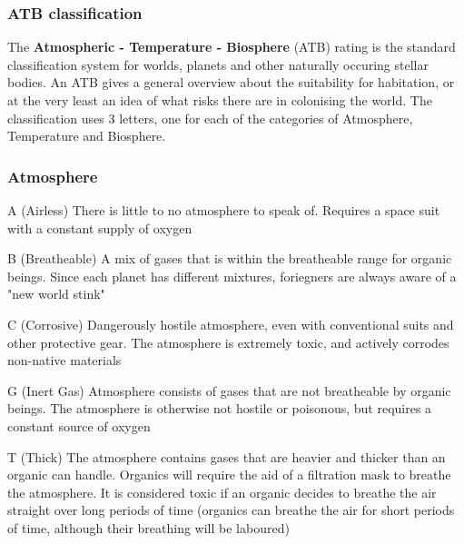 \subsubsection{ATB classification}
\label{sec:sector-atb}

The \textbf{Atmospheric - Temperature - Biosphere} (ATB) rating is the standard classification system for worlds, planets and other naturally occuring stellar bodies. An ATB gives a general overview about the suitability for habitation, or at the very least an idea of what risks there are in colonising the world. The classification uses 3 letters, one for each of the categories of Atmosphere, Temperature and Biosphere.

\subsubsection{Atmosphere}

\begin{genericsection}{A (Airless)}
  There is little to no atmosphere to speak of. Requires a space suit with a constant supply of oxygen
\end{genericsection}

\begin{genericsection}{B (Breatheable)}
  A mix of gases that is within the breatheable range for organic beings. Since each planet has different mixtures, foriegners are always aware of a "new world stink"
\end{genericsection}

\begin{genericsection}{C (Corrosive)}
  Dangerously hostile atmosphere, even with conventional suits and other protective gear. The atmosphere is extremely toxic, and actively corrodes non-native materials
\end{genericsection}

\begin{genericsection}{G (Inert Gas)}
  Atmosphere consists of gases that are not breatheable by organic beings. The atmosphere is otherwise not hostile or poisonous, but requires a constant source of oxygen
\end{genericsection}

\begin{genericsection}{T (Thick)}
  The atmosphere contains gases that are heavier and thicker than an organic can handle. Organics will require the aid of a filtration mask to breathe the atmosphere. It is considered toxic if an organic decides to breathe the air straight over long periods of time (organics can breathe the air for short periods of time, although their breathing will be laboured)
\end{genericsection}

